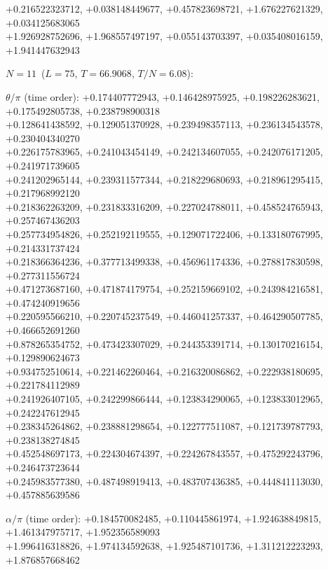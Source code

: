 \begin{flushleft}
+0.216522323712, +0.038148449677, +0.457823698721, +1.676227621329, +0.034125683065 \\
+1.926928752696, +1.968557497197, +0.055143703397, +0.035408016159, +1.941447632943
\vspace{3pt}\par\noindent\textbf{$N=11$}\ ($L=75$, $T=66.9068$, $T/N=6.08$):
\par\noindent$\theta/\pi$ (time order):
+0.174407772943, +0.146428975925, +0.198226283621, +0.175492805738, +0.238798900318 \\
+0.128641438592, +0.129051370928, +0.239498357113, +0.236134543578, +0.230404340270 \\
+0.226175783965, +0.241043454149, +0.242134607055, +0.242076171205, +0.241971739605 \\
+0.241202965144, +0.239311577344, +0.218229680693, +0.218961295415, +0.217968992120 \\
+0.218362263209, +0.231833316209, +0.227024788011, +0.458524765943, +0.257467436203 \\
+0.257734954826, +0.252192119555, +0.129071722406, +0.133180767995, +0.214331737424 \\
+0.218366364236, +0.377713499338, +0.456961174336, +0.278817830598, +0.277311556724 \\
+0.471273687160, +0.471874179754, +0.252159669102, +0.243984216581, +0.474240919656 \\
+0.220595566210, +0.220745237549, +0.446041257337, +0.464290507785, +0.466652691260 \\
+0.878265354752, +0.473423307029, +0.244353391714, +0.130170216154, +0.129890624673 \\
+0.934752510614, +0.221462260464, +0.216320086862, +0.222938180695, +0.221784112989 \\
+0.241926407105, +0.242299866444, +0.123834290065, +0.123833012965, +0.242247612945 \\
+0.238345264862, +0.238881298654, +0.122777511087, +0.121739787793, +0.238138274845 \\
+0.452548697173, +0.224304674397, +0.224267843557, +0.475292243796, +0.246473723644 \\
+0.245983577380, +0.487498919413, +0.483707436385, +0.444841113030, +0.457885639586
\par\noindent$\alpha/\pi$ (time order):
+0.184570082485, +0.110445861974, +1.924638849815, +1.461347975717, +1.952356589093 \\
+1.996416318826, +1.974134592638, +1.925487101736, +1.311212223293, +1.876857668462 \\

\end{flushleft}
